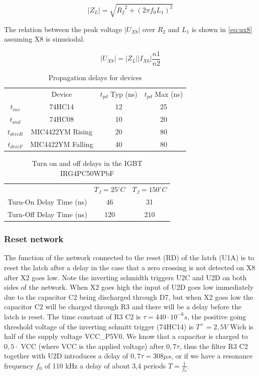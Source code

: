 \begin{equation} \label{eq:zl}
    |Z_{L}| = \sqrt{{R_2}^2 + (2 \pi f_0 L_1)^2}
\end{equation}

The relation between the peak voltage $|U_{X8}|$ over $R_2$ and $L_1$ is shown in \cref{eq:ux8} assuming X8 is sinusiodal.

\begin{equation} \label{eq:ux8}
    |U_{X8}| = |Z_L| |I_{X6}| \frac{n1}{n2}
\end{equation}



\begin{table}[]
    \centering
    \begin{tabular}{c|c|c|c}
                &   Device              & $t_{pd}$ Typ (ns)   & $t_{pd}$ Max (ns) \\
        $t_{inv}$ &   74HC14              & 12            & 25\\
        $t_{and}$ &   74HC08              & 10            & 20\\
        $t_{driv R}$& MIC4422YM Rising    & 20            & 80\\
        $t_{driv F}$& MIC4422YM Falling   & 40            & 80
    \end{tabular}
    \caption{Propagation delays for devices}
    \label{tab:tpd}
\end{table}

\begin{table}[]
    \centering
    \begin{tabular}{c|c|c}
                            & $T_J = 25 ^{\circ}C$ & $T_J = 150 ^{\circ}C$ \\
        Turn-On Delay Time (ns)  & 46                & 31    \\
        Turn-Off Delay Time (ns) & 120               & 210
    \end{tabular}
    \caption{Turn on and off delays in the IGBT IRG4PC50WPbF}
    \label{tab:tigbt}
\end{table}

\subsubsection{Reset network}
\label{sec:reset_net}
The function of the network connected to the reset (RD) of the latch (U1A) is to reset the latch after a delay in the case that a zero crossing is not detected on X8 after X2 goes low. Note the inverting schmidth triggers U2C and U2D on both sides of the network. When X2 goes high the input of U2D goes low immediately due to the capacitor C2 being discharged through D7, but when X2 goes low the capacitor C2 will be charged through R3 and there will be a delay before the latch is reset. The time constant of R3 C2 is $\tau = 440 \cdot 10^{-6} s$, the positive going threshold voltage of the inverting schmitt trigger (74HC14) is $T^+ = 2,5V$ Wich is half of the supply voltage VCC\_P5V0. We know that a capacitor is charged to $0,5 \cdot$ VCC (where VCC is the applied voltage) after $0,7 \tau$, thus the filter R3 C2 together with U2D introduces a delay of $0,7 \tau = 308\mu s$, or if we have a resonance frequency $f_0$ of 110 kHz a delay of about 3,4 periods $T = \frac{1}{f_0}$.

